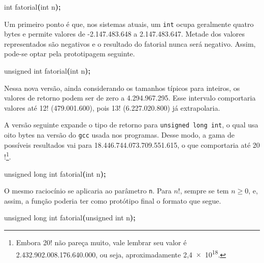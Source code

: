 \documentclass[
  11pt,
  a4paper,
]{scrbook}
\newenvironment{Shaded}{\begin{snugshade}}{\end{snugshade}}
\newcommand{\DataTypeTok}[1]{\textcolor[rgb]{0.13,0.29,0.53}{#1}}
\newcommand{\NormalTok}[1]{#1}
\newcommand{\OperatorTok}[1]{\textcolor[rgb]{0.81,0.36,0.00}{\textbf{#1}}}
\begin{document}
\begin{Shaded}
\begin{Highlighting}[]
\DataTypeTok{int}\NormalTok{ fatorial}\OperatorTok{(}\DataTypeTok{int}\NormalTok{ n}\OperatorTok{);}
\end{Highlighting}
\end{Shaded}

Um primeiro ponto é que, nos sistemas atuais, um \texttt{int} ocupa
geralmente quatro bytes e permite valores de -2.147.483.648 a
2.147.483.647. Metade dos valores representados são negativos e o
resultado do fatorial nunca será negativo. Assim, pode-se optar pela
prototipagem seguinte.

\begin{Shaded}
\begin{Highlighting}[]
\DataTypeTok{unsigned} \DataTypeTok{int}\NormalTok{ fatorial}\OperatorTok{(}\DataTypeTok{int}\NormalTok{ n}\OperatorTok{);}
\end{Highlighting}
\end{Shaded}

Nessa nova versão, ainda considerando os tamanhos típicos para inteiros,
os valores de retorno podem ser de zero a 4.294.967.295. Esse intervalo
comportaria valores até 12\(!\) (479.001.600), pois 13\(!\)
(6.227.020.800) já extrapolaria.

A versão seguinte expande o tipo de retorno para
\texttt{unsigned\ long\ int}, o qual usa oito bytes na versão do
\texttt{gcc} usada nos programas. Desse modo, a gama de possíveis
resultados vai para 18.446.744.073.709.551.615, o que comportaria até
20\(!\)\footnote{Embora 20\(!\) não pareça muito, vale lembrar seu valor
  é 2.432.902.008.176.640.000, ou seja, aproximadamente
  2,4~\(\times\)~10\textsuperscript{18}.}.

\begin{Shaded}
\begin{Highlighting}[]
\DataTypeTok{unsigned} \DataTypeTok{long} \DataTypeTok{int}\NormalTok{ fatorial}\OperatorTok{(}\DataTypeTok{int}\NormalTok{ n}\OperatorTok{);}
\end{Highlighting}
\end{Shaded}

O mesmo raciocínio se aplicaria ao parâmetro \texttt{n}. Para \(n!\),
sempre se tem \(n \geq 0\), e, assim, a função poderia ter como
protótipo final o formato que segue.

\begin{Shaded}
\begin{Highlighting}[]
\DataTypeTok{unsigned} \DataTypeTok{long} \DataTypeTok{int}\NormalTok{ fatorial}\OperatorTok{(}\DataTypeTok{unsigned} \DataTypeTok{int}\NormalTok{ n}\OperatorTok{);}
\end{Highlighting}
\end{Shaded}
\end{document}

